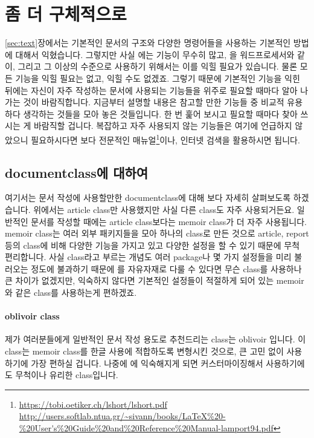 
\section{좀 더 구체적으로}
\label{sec:adv}
\ref{sec:text}장에서는 기본적인 문서의 구조와 다양한 명령어들을 사용하는 기본적인 방법에 대해서 익혔습니다.
그렇지만 사실 \lt 에는 기능이 무수히 많고, \lt 을 워드프로세서와 같이, 그리고 그 이상의 수준으로 사용하기 위해서는 이를 익힐 필요가 있습니다.
물론 모든 기능을 익힐 필요는 없고, 익힐 수도 없겠죠.
그렇기 때문에 기본적인 기능을 익힌 뒤에는 자신이 자주 작성하는 문서에 사용되는 기능들을 위주로 필요할 때마다 알아 나가는 것이 바람직합니다.
지금부터 설명할 내용은 참고할 만한 기능들 중 비교적 유용하다 생각하는 것들을 모아 놓은 것들입니다.
한 번 훑어 보시고 필요할 때마다 찾아 쓰시는 게 바람직할 겁니다.
복잡하고 자주 사용되지 않는 기능들은 여기에 언급하지 않았으니 필요하시다면 보다 전문적인 매뉴얼\footnote{\url{https://tobi.oetiker.ch/lshort/lshort.pdf}\\ \url{http://users.softlab.ntua.gr/~sivann/books/LaTeX\%20-\%20User's\%20Guide\%20and\%20Reference\%20Manual-lamport94.pdf}}이나, 인터넷 검색을 활용하시면 됩니다.

\subsection{documentclass에 대하여}
\label{sec:advanced-documentclass}
여기서는 문서 작성에 사용할만한 documentclass에 대해 보다 자세히 살펴보도록 하겠습니다.
위에서는 article class만 사용했지만 사실 다른 class도 자주 사용되거든요.
일반적인 문서를 작성할 때에는 article class보다는 memoir class가 더 자주 사용됩니다.
memoir class는 여러 외부 패키지들을 모아 하나의 class로 만든 것으로 article, report 등의 class에 비해 다양한 기능을 가지고 있고 다양한 설정을 할 수 있기 때문에 무척 편리합니다.
사실 class라고 부르는 개념도 여러 package나 몇 가지 설정들을 미리 불러오는 정도에 불과하기 때문에 \lt 를 자유자재로 다룰 수 있다면 무슨 class를 사용하나 큰 차이가 없겠지만, 익숙하지 않다면 기본적인 설정들이 적절하게 되어 있는 memoir와 같은 class를 사용하는게 편하겠죠.

\paragraph{oblivoir class}
제가 여러분들에게 일반적인 문서 작성 용도로 추천드리는 class는 oblivoir 입니다.
이 class는 memoir class를 한글 사용에 적합하도록 변형시킨 것으로, 큰 고민 없이 사용하기에 가장 편하실 겁니다.
나중에 \lt 에 익숙해지게 되면 커스터마이징해서 사용하기에도 무척이나 유리한 class입니다.

